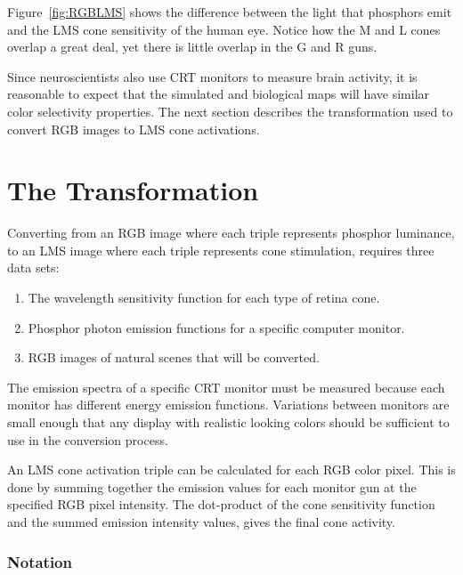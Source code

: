 \documentclass[12pt]{article}
\begin{document}
Figure~\ref{fig:RGBLMS} shows the difference between the light that
phosphors emit and the LMS cone sensitivity of the human eye.  Notice
how the M and L cones overlap a great deal, yet there is little
overlap in the G and R guns.

Since neuroscientists also use CRT monitors to measure brain activity,
it is reasonable to expect that the simulated and biological maps will
have similar color selectivity properties.  The next section describes
the transformation used to convert RGB images to LMS cone activations.


\section{The Transformation}

Converting from an RGB image where each triple represents phosphor
luminance, to an LMS image where each triple represents cone
stimulation, requires three data sets: 

\begin{enumerate}
\item The wavelength sensitivity function for each type of retina cone.
\item Phosphor photon emission functions for a specific computer 
      monitor.
\item RGB images of natural scenes that will be converted.
\end{enumerate}

The emission spectra of a specific CRT monitor must be measured
because each monitor has different energy emission functions.
Variations between monitors are small enough that any display with
realistic looking colors should be sufficient to use in the conversion
process.

An LMS cone activation triple can be calculated for each RGB color
pixel.  This is done by summing together the emission values for
each monitor gun at the specified RGB pixel intensity.  The
dot-product of the cone sensitivity function and the summed emission
intensity values, gives the final cone activity.

\subsubsection*{Notation}
\end{document}
